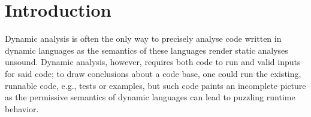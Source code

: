 \documentclass[sigplan,anonymous,review]{acmart}
\begin{document}
\begin{abstract}
%
%




\end{abstract}

\maketitle

\section{Introduction}
\label{sec:introduction}

Dynamic analysis is often the only way to precisely analyse code written in dynamic languages as the semantics of these languages render static analyses unsound. 
Dynamic analysis, however, requires both code to run and valid inputs for said code; to draw conclusions about a code base, one could run the existing, runnable code, e.g., tests or examples, but such code paints an incomplete picture as the permissive semantics of dynamic languages can lead to puzzling runtime behavior.
\end{document}
